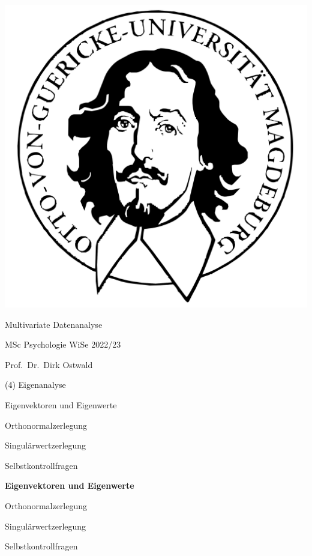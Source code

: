 \documentclass[
  8pt,
  ignorenonframetext,
]{beamer}
\author{}
\date{\vspace{-2.5em}}
\begin{document}
\begin{frame}[plain]{}
\protect\hypertarget{section}{}
\center

\begin{center}\includegraphics[width=0.2\linewidth]{4_Abbildungen/mvda_4_otto} \end{center}

\vspace{2mm}

\Huge

Multivariate Datenanalyse \vspace{6mm}

\large

MSc Psychologie WiSe 2022/23

\vspace{6mm}
\large

Prof.~Dr.~Dirk Ostwald
\end{frame}

\begin{frame}[plain]{}
\protect\hypertarget{section-1}{}
\vfill
\center
\huge

\textcolor{black}{(4) Eigenanalyse} \vfill
\end{frame}

\begin{frame}{}
\protect\hypertarget{section-2}{}
\vfill
{}
\Large

Eigenvektoren und Eigenwerte

Orthonormalzerlegung

Singulärwertzerlegung

Selbstkontrollfragen \vfill 
\end{frame}

\begin{frame}{}
\protect\hypertarget{section-3}{}
\vfill
{}
\Large

\textbf{Eigenvektoren und Eigenwerte}

Orthonormalzerlegung

Singulärwertzerlegung

Selbstkontrollfragen \vfill 
\end{frame}
\end{document}
